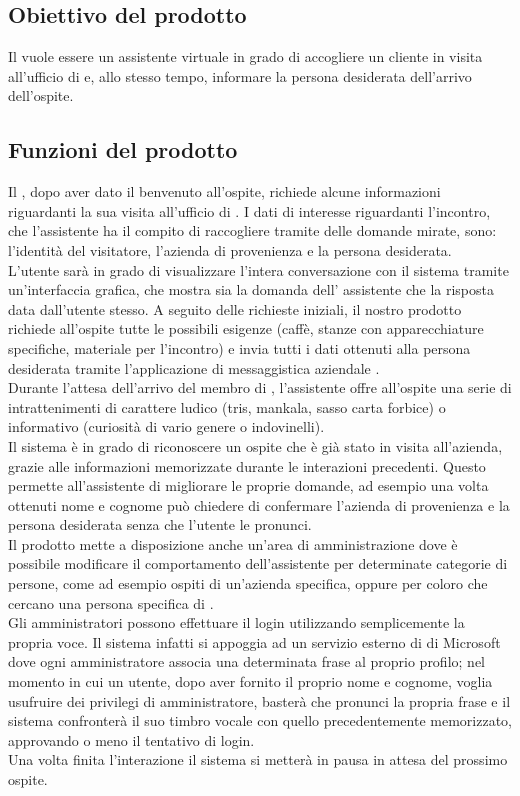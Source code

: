 \subsection{Obiettivo del prodotto}
Il  vuole essere un assistente virtuale in grado di accogliere un cliente in visita all'ufficio di \PROPONENTE{} e, allo stesso tempo, informare la persona desiderata dell'arrivo dell'ospite. 
\subsection{Funzioni del prodotto}
Il , dopo aver dato il benvenuto all'ospite, richiede alcune informazioni riguardanti la sua visita all'ufficio di \PROPONENTE. I dati di interesse riguardanti l'incontro, che l'assistente ha il compito di raccogliere tramite delle domande mirate, sono: l'identità del visitatore, l'azienda di provenienza e la persona desiderata.\\
L'utente sarà in grado di visualizzare l'intera conversazione con il sistema tramite un'interfaccia grafica, che mostra sia la domanda dell' assistente che la risposta data dall'utente stesso.
A seguito delle richieste iniziali, il nostro prodotto richiede all'ospite tutte le possibili esigenze (caffè, stanze con apparecchiature specifiche, materiale per l'incontro) e invia tutti i dati ottenuti alla persona desiderata tramite l'applicazione di messaggistica aziendale .\\
Durante l'attesa dell'arrivo del membro di \PROPONENTE{}, l'assistente offre all'ospite una serie di intrattenimenti di carattere ludico (tris, mankala, sasso carta forbice) o informativo (curiosità di vario genere o indovinelli).\\
Il sistema è in grado di riconoscere un ospite che è già stato in visita all'azienda, grazie alle informazioni memorizzate durante le interazioni precedenti. Questo permette all'assistente di migliorare le proprie domande, ad esempio una volta ottenuti nome e cognome può chiedere di confermare l'azienda di provenienza e la persona desiderata senza che l'utente le pronunci.\\
Il prodotto mette a disposizione anche un'area di amministrazione dove è possibile modificare il comportamento dell'assistente per determinate categorie di persone, come ad esempio ospiti di un'azienda specifica, oppure per coloro che cercano una persona specifica di \PROPONENTE{}. \\
Gli amministratori possono effettuare il login utilizzando semplicemente la propria voce. Il sistema infatti si appoggia ad un servizio esterno di  di Microsoft dove ogni amministratore associa una determinata frase al proprio profilo; nel momento in cui un utente, dopo aver fornito il proprio nome e cognome, voglia usufruire dei privilegi di amministratore, basterà che pronunci la propria frase e il sistema confronterà il suo timbro vocale con quello precedentemente memorizzato, approvando o meno il tentativo di login.\\
Una volta finita l'interazione il sistema si metterà in pausa in attesa del prossimo ospite.

